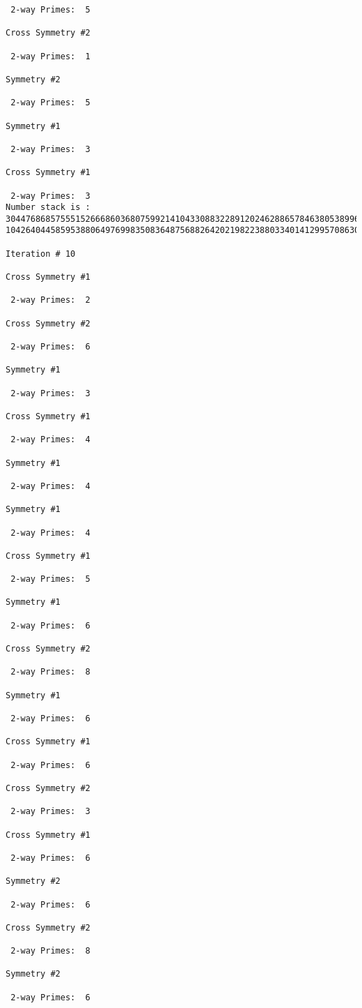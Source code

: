 \begin{verbatim}
 2-way Primes: 	5

Cross Symmetry #2

 2-way Primes: 	1

Symmetry #2

 2-way Primes: 	5

Symmetry #1

 2-way Primes: 	3

Cross Symmetry #1

 2-way Primes: 	3
Number stack is :
30447686857555152666860368075992141043308832289120246288657846380538996794608835958544046240163340857
10426404458595388064976998350836487568826420219822388033401412995708630686662515557586867440375804336

Iteration #	10

Cross Symmetry #1

 2-way Primes: 	2

Cross Symmetry #2

 2-way Primes: 	6

Symmetry #1

 2-way Primes: 	3

Cross Symmetry #1

 2-way Primes: 	4

Symmetry #1

 2-way Primes: 	4

Symmetry #1

 2-way Primes: 	4

Cross Symmetry #1

 2-way Primes: 	5

Symmetry #1

 2-way Primes: 	6

Cross Symmetry #2

 2-way Primes: 	8

Symmetry #1

 2-way Primes: 	6

Cross Symmetry #1

 2-way Primes: 	6

Cross Symmetry #2

 2-way Primes: 	3

Cross Symmetry #1

 2-way Primes: 	6

Symmetry #2

 2-way Primes: 	6

Cross Symmetry #2

 2-way Primes: 	8

Symmetry #2

 2-way Primes: 	6


\end{verbatim}

